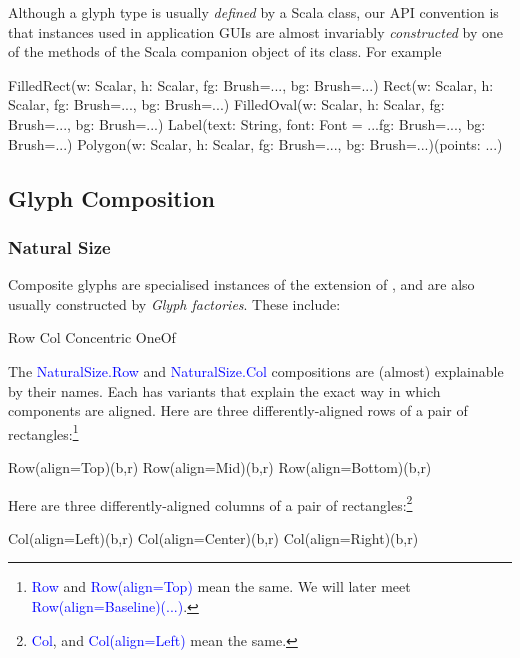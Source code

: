 \documentclass[12pt,a4paper]{article}
\def\Scala#1{\textcolor{blue}{\textsf{#1}}}
\def\SS#1{\subsection{#1}}
\def\SSS#1{\subsubsection*{#1}}
\begin{document}
Although a glyph type is usually \textit{defined} by a Scala class,
our API convention is that instances used in application GUIs are
almost invariably \textit{constructed} by one of the methods of the
Scala companion object of its class. For example

\begin{scala}
 FilledRect(w: Scalar, h: Scalar,    fg: Brush=..., bg: Brush=...)
 Rect(w: Scalar, h: Scalar,          fg: Brush=..., bg: Brush=...)
 FilledOval(w: Scalar, h: Scalar,    fg: Brush=..., bg: Brush=...)
 Label(text: String, font: Font = ...fg: Brush=..., bg: Brush=...)
 Polygon(w: Scalar, h: Scalar,
         fg: Brush=..., bg: Brush=...)(points: ...)
\end{scala}




\clearpage



\SS{Glyph Composition}
\SSS{Natural Size}

Composite glyphs are specialised instances of the 
extension of , and are also usually constructed by
\textit{Glyph factories}. These include:

\begin{scala}

        Row             Col
        Concentric      OneOf
\end{scala}

The \Scala{NaturalSize.Row} and \Scala{NaturalSize.Col} compositions are (almost)
explainable by their names. Each has variants that
explain the exact way in which components are aligned. Here
are three differently-aligned rows of a pair of rectangles:\footnote{
\Scala{Row} and \Scala{Row(align=Top)}
mean the same. We will later meet \Scala{Row(align=Baseline)(...)}.}
\begin{center}
\quad\quad
{}
\quad\quad
{}
\end{center}
\begin{scala}
   Row(align=Top)(b,r) Row(align=Mid)(b,r) Row(align=Bottom)(b,r)
\end{scala}



Here are three differently-aligned columns of a pair of rectangles:\footnote{
\Scala{Col}, and \Scala{Col(align=Left)} mean the same.}

\begin{center}
\quad\quad
{}
\quad\quad
{}
\end{center}
\begin{scala}
   Col(align=Left)(b,r) Col(align=Center)(b,r) Col(align=Right)(b,r)
\end{scala}
\end{document}
